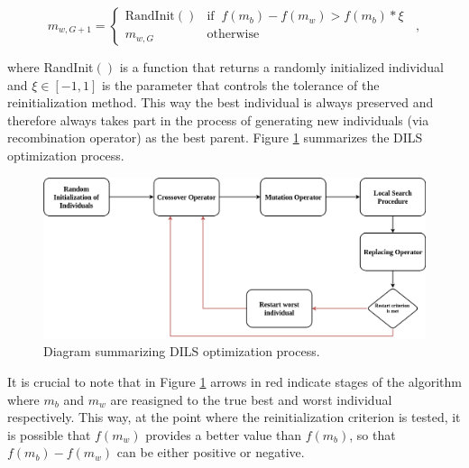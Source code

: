 \documentclass[review]{elsarticle}
\begin{document}
\begin{equation}
m_{w,G+1} = \left\{ \begin{array}{lc}
\text{RandInit}() &   \text{if} \;\; f(m_b) - f(m_w) > f(m_b) * \xi \;\;\\
m_{w,G} &  \text{otherwise}
\end{array}
\right.,
\label{eq2}
\end{equation}

\noindent where RandInit$()$ is a function that returns a randomly initialized individual and $\xi \in [-1,1]$ is the parameter that controls the tolerance of the reinitialization method. This way the best individual is always preserved and therefore always takes part in the process of generating new individuals (via recombination operator) as the best parent. Figure \ref{img:DILS_diag} summarizes the DILS optimization process.

\begin{figure}[!h]
	\centering
	\includegraphics[scale=0.25]{Figures/DILSDiagram.png}
	\caption{Diagram summarizing DILS optimization process.}\label{img:DILS_diag}
\end{figure}

It is crucial to note that in Figure \ref{img:DILS_diag} arrows in red indicate stages of the algorithm where $m_b$ and $m_w$ are reasigned to the true best and worst individual respectively. This way, at the point where the reinitialization criterion is tested, it is possible that $f(m_w)$ provides a better value than $f(m_b)$, so that $f(m_b) - f(m_w)$ can be either positive or negative. 
\end{document}
